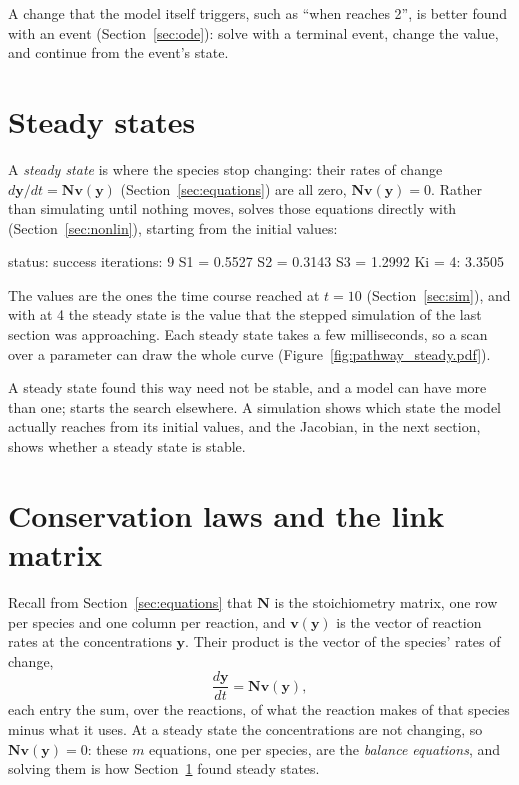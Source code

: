 \documentclass[11pt,a4paper,openany]{report}
\begin{document}
{{A change that the model itself triggers, such as ``when  reaches
2'', is better found with an event (Section~\ref{sec:ode}): solve with a
terminal event, change the value, and continue from the event's state.

\section{Steady states}\label{sec:steady}

A \emph{steady state} is where the species stop changing: their rates of
change $d\mathbf{y}/dt = \mathbf{N} \mathbf{v}(\mathbf{y})$
(Section~\ref{sec:equations}) are all zero, $\mathbf{N}
\mathbf{v}(\mathbf{y}) = 0$.
Rather than simulating until nothing moves, 
solves those equations directly with 
(Section~\ref{sec:nonlin}), starting from the initial values:

\begin{axonout}
status: success  iterations: 9
S1 = 0.5527
S2 = 0.3143
S3 = 1.2992
Ki = 4: 3.3505
\end{axonout}

The values are the ones the time course reached at $t = 10$
(Section~\ref{sec:sim}), and with  at 4 the steady state is the
value that the stepped simulation of the last section was approaching. Each
steady state takes a few milliseconds, so a scan over a parameter can draw
the whole curve (Figure~\ref{fig:pathway_steady.pdf}).


A steady state found this way need not be stable, and a model can have more
than one;  starts the search elsewhere. A simulation shows which
state the model actually reaches from its initial values, and the Jacobian,
in the next section, shows whether a steady state is stable.

\section{Conservation laws and the link matrix}\label{sec:conservation}

Recall from Section~\ref{sec:equations} that $\mathbf{N}$ is the stoichiometry matrix, one row per species and one
column per reaction, and $\mathbf{v}(\mathbf{y})$ is the vector of reaction
rates at the concentrations $\mathbf{y}$. Their product is the vector of the
species' rates of change,
\[
  \frac{d\mathbf{y}}{dt} = \mathbf{N} \mathbf{v}(\mathbf{y}) ,
\]
each entry the sum, over the reactions, of what the reaction makes of that
species minus what it uses. At a steady state the concentrations are not changing, so
$\mathbf{N} \mathbf{v}(\mathbf{y}) = 0$: these $m$ equations, one per
species, are the \emph{balance equations}, and solving them is how
Section~\ref{sec:steady} found steady states.

}}
\end{document}
